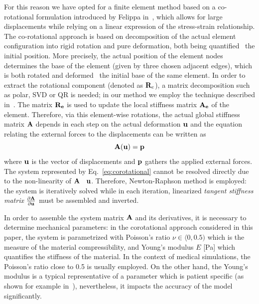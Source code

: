 For this reason we have opted for a finite element method based on a co-rotational formulation introduced by Felippa in~\cite{Felippa2005}, which allows for
large displacements while relying on a linear expression of the stress-strain relationship.
The co-rotational approach is based on decomposition of the actual element configuration into rigid rotation and pure deformation, 
both being quantified \wrt~the initial position. More precisely, the actual position of the element nodes
determines the base of the element (given by three chosen adjacent edges), which is both rotated and deformed \wrt\ the initial base of the same element.
In order to extract the rotational component (denoted as $\mathbf{R}_e$), a matrix decomposition such as polar, SVD or QR is needed;
in our method we employ the technique described in~\cite{Nesme2005}.
The matrix $\mathbf{R}_{\mathbf{e}}$ is used to update the local stiffness matrix $\mathbf{A}_{\mathbf{e}}$ of the element.
Therefore, via this element-wise rotations, the actual global stiffness matrix $\mathbf{A}$ depends in each step on the actual deformation $\mathbf{u}$
and the equation relating the external forces to the displacements can be written as
\begin{equation}
\bK(\bu) = \bfo
\label{eq:corotational}
\end{equation}
\noindent where $\mathbf{u}$ is the vector of displacements and $\mathbf{p}$ gathers the applied external forces.
The system represented by Eq.~\ref{eq:corotational} cannot be 
resolved directly due to the non-linearity of $\mathbf{A}$ \wrt\ $\mathbf{u}$. Therefore, Newton-Raphson method is employed: 
the system is iteratively solved while in each iteration, linearized \emph{tangent stiffness matrix} $\frac{\partial\mathbf{A}}{\partial\mathbf{u}}$ must
be assembled and inverted.

In order to assemble the system matrix $\mathbf{A}$ and its derivatives, it is necessary to determine mechanical parameters: in the corotational approach considered 
in this paper, the system is parametrized with Poisson's ratio $\nu\in\langle 0,0.5)$ which is the measure of the material compressibility, 
and Young's modulus $E$ [Pa] which quantifies the stiffness of the material. In the context of medical simulations, the Poisson's ratio
close to 0.5 is usually employed. On the other hand, the Young's modulus is a typical representative of a parameter which is patient specific
(as shown for example in~\cite{yeh2002elastic}), nevertheless, it impacts the accuracy of the model significantly.

